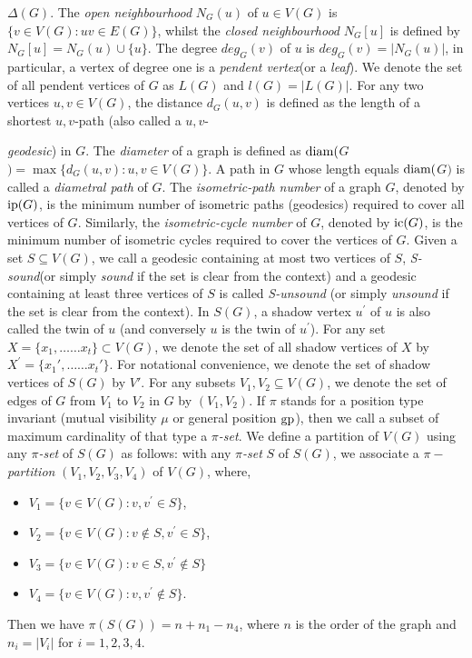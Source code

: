 \documentclass[a4paper,12pt]{article}
\newcommand{\gp}{{\rm gp}}
\newcommand{\diam}{\rm diam}
\newcommand{\ip}{{\rm ip}}
\newcommand{\ic}{{\rm ic}}
\begin{document}
$\Delta(G)$.  The \emph{open neighbourhood} $N_G(u)$ of $u \in V(G)$ is $\{ v \in V(G): uv\in E(G)\}$, whilst the \emph{closed neighbourhood} $N_G[u]$ is defined by $N_G[u] = N_G(u) \cup \{ u\} $. The degree $deg_{G}(v)$ of $u$ is $deg_{G}(v)=|N_G(u)|$, in particular, a vertex of degree one is a \emph{pendent vertex}(or a \emph{leaf}). We denote the set of all pendent vertices of $G$ as $L(G)$ and $l(G)=|L(G)|$.  For any two vertices $u,v\in V(G)$, the distance $d_{G}(u,v)$ is defined as the length of a shortest $u,v$-path (also called a $u,v$-{\emph{geodesic}) in $G$. The \emph{diameter} of a graph is defined as $\diam($$G$$)=\max\{d_{G}(u,v) : u,v \in V(G)\}$. A path in $G$ whose length equals $\diam($$G$$)$ is called a \emph{diametral path} of $G$. The \emph{isometric-path number} of a graph $G$, denoted by $\ip(G)$, is the minimum number of isometric paths (geodesics) required to cover all vertices of $G$.
Similarly, the \emph{isometric-cycle number} of $G$, denoted by $\ic(G)$, is the minimum number of isometric cycles required to cover the vertices of $G$.
 Given a set $S \subseteq V(G)$, we call a geodesic containing at most two vertices of $S$, \emph{S-sound}(or simply \emph{sound} if the set is clear from the context) and a geodesic containing at least three vertices of 
$S$ is called \emph{S-unsound} (or simply \emph{unsound} if the set is clear from the context). In $S(G)$, a shadow vertex $u^{\prime}$ of $u$ is also called the twin of $u$ (and conversely $u$ is the twin of $u^{\prime}$). For any set $X = \{x_{1},\dots \dots x_{t}\} \subset V(G)$, we denote the set of all shadow vertices of $X$ by $X^{\prime}= \{x_{1}',\dots \dots x_{t}'\}$. For notational convenience, we denote the set of shadow vertices of $S(G)$ by $V'$. For any subsets $V_1, V_2  \subseteq V(G)$, we denote the set of edges of $G$ from $V_1$ to $V_2$ in $G$ by $(V_1,V_2)$. If $\pi $ stands for a position type invariant (mutual visibility $\mu$ or general position $\gp$), then we call a subset of maximum cardinality of that type a \emph{$\pi $-set}. We define a partition of $V(G)$ using any \emph{$\pi $-set} of $S(G)$ as follows: with any \emph{$\pi $-set} $S$ of $S(G)$, we associate a \emph{$\pi-$partition} $(V_1,V_2,V_3,V_4)$ of $V(G)$, where,
\begin{itemize}
   \item $V_1=\{v \in V(G) : v,v^{\prime} \in S\}$,
   \item $V_2=\{v\in V(G) : v \notin S , v^{\prime} \in S\}$,
   \item $V_3=\{v\in V(G) : v \in S , v^{\prime} \notin S \}$ 
   \item $V_4=\{v \in V(G) : v,v^{\prime} \notin S\}$.
\end{itemize}
Then we have $\pi(S(G)) = n + n_1-n_4$, where $n$ is the order of the graph and $n_i = |V_i|$ for $i = 1, 2, 3, 4$. 

}
\end{document}
